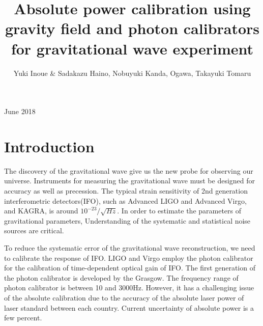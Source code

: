 \documentclass[12pt]{iopart}
\begin{document}
\title[]{Absolute power calibration using gravity field and photon calibrators for gravitational wave experiment}

\author{Yuki Inoue \& Sadakazu Haino, Nobuyuki Kanda, Ogawa, Takayuki Tomaru}

\address{IOP Publishing, Temple Circus, Temple Way, Bristol BS1 6HG, UK}
\vspace{10pt}
\begin{indented}
\item[]June 2018
\end{indented}

\begin{abstract}
\end{abstract}

%
%
%
% 
%



\section{Introduction}

The discovery of the gravitational wave give us the new probe for observing our universe. 
Instruments for measuring the gravitational wave must be designed for accuracy as well as precession.
The typical strain sensitivity of 2nd generation interferometric detectors(IFO), such as Advanced LIGO and Advanced Virgo, and KAGRA, is around $10^{-23}/\sqrt{Hz}$. In order to estimate the parameters of gravitational parameters, Understanding of the systematic and statistical noise sources are critical.

To reduce the systematic error of the gravitational wave reconstruction, we need to calibrate the response of IFO. LIGO and Virgo employ the photon calibrator for the calibration of time-dependent optical gain of IFO. The first generation of the photon calibrator is developed by the Grasgow.  The frequency range of photon calibrator is between 10 and 3000Hz.  However, it has a challenging issue of the absolute calibration due to the accuracy of the absolute laser power of laser standard between each country. Current uncertainty of absolute power is a few percent.
\end{document}
